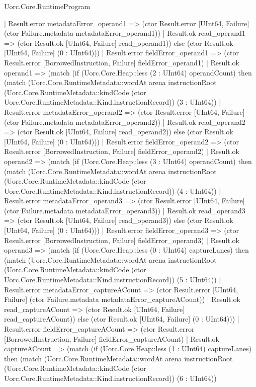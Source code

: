 \begin{lexlean}{Uorc.Core.RuntimeProgram}
\begin{semanticmodule}
{                  | Result.error metadataError_operand1 => (ctor Result.error [UInt64, Failure] (ctor Failure.metadata metadataError_operand1))
                  | Result.ok read_operand1 => (ctor Result.ok [UInt64, Failure] read_operand1)) else (ctor Result.ok [UInt64, Failure] (0 : UInt64)))
                | Result.error fieldError_operand1 => (ctor Result.error [BorrowedInstruction, Failure] fieldError_operand1)
                | Result.ok operand1 => (match (if (Uorc.Core.Heap::less (2 : UInt64) operandCount) then (match (Uorc.Core.RuntimeMetadata::wordAt arena instructionRoot (Uorc.Core.RuntimeMetadata::kindCode (ctor Uorc.Core.RuntimeMetadata::Kind.instructionRecord)) (3 : UInt64))
                    | Result.error metadataError_operand2 => (ctor Result.error [UInt64, Failure] (ctor Failure.metadata metadataError_operand2))
                    | Result.ok read_operand2 => (ctor Result.ok [UInt64, Failure] read_operand2)) else (ctor Result.ok [UInt64, Failure] (0 : UInt64)))
                  | Result.error fieldError_operand2 => (ctor Result.error [BorrowedInstruction, Failure] fieldError_operand2)
                  | Result.ok operand2 => (match (if (Uorc.Core.Heap::less (3 : UInt64) operandCount) then (match (Uorc.Core.RuntimeMetadata::wordAt arena instructionRoot (Uorc.Core.RuntimeMetadata::kindCode (ctor Uorc.Core.RuntimeMetadata::Kind.instructionRecord)) (4 : UInt64))
                      | Result.error metadataError_operand3 => (ctor Result.error [UInt64, Failure] (ctor Failure.metadata metadataError_operand3))
                      | Result.ok read_operand3 => (ctor Result.ok [UInt64, Failure] read_operand3)) else (ctor Result.ok [UInt64, Failure] (0 : UInt64)))
                    | Result.error fieldError_operand3 => (ctor Result.error [BorrowedInstruction, Failure] fieldError_operand3)
                    | Result.ok operand3 => (match (if (Uorc.Core.Heap::less (0 : UInt64) captureLanes) then (match (Uorc.Core.RuntimeMetadata::wordAt arena instructionRoot (Uorc.Core.RuntimeMetadata::kindCode (ctor Uorc.Core.RuntimeMetadata::Kind.instructionRecord)) (5 : UInt64))
                        | Result.error metadataError_captureACount => (ctor Result.error [UInt64, Failure] (ctor Failure.metadata metadataError_captureACount))
                        | Result.ok read_captureACount => (ctor Result.ok [UInt64, Failure] read_captureACount)) else (ctor Result.ok [UInt64, Failure] (0 : UInt64)))
                      | Result.error fieldError_captureACount => (ctor Result.error [BorrowedInstruction, Failure] fieldError_captureACount)
                      | Result.ok captureACount => (match (if (Uorc.Core.Heap::less (1 : UInt64) captureLanes) then (match (Uorc.Core.RuntimeMetadata::wordAt arena instructionRoot (Uorc.Core.RuntimeMetadata::kindCode (ctor Uorc.Core.RuntimeMetadata::Kind.instructionRecord)) (6 : UInt64))
}
\end{semanticmodule}
\end{lexlean}
